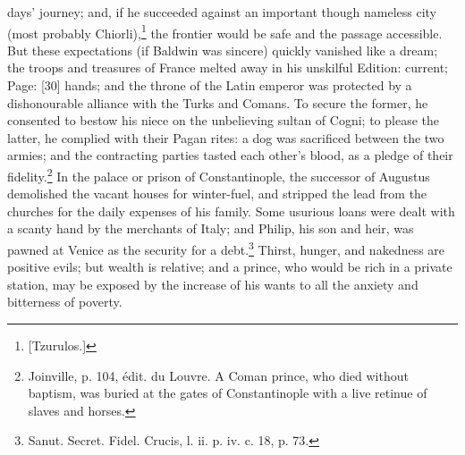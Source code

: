 days\texthebrew{}’ journey; and, if he succeeded against an important though nameless city (most probably Chiorli),\footnote{[Tzurulos.]} the frontier would be safe and the passage accessible. But these expectations (if Baldwin was sincere) quickly vanished like a dream; the troops and treasures of France melted away in his unskilful Edition: current; Page: [30] hands; and the throne of the Latin emperor was protected by a dishonourable alliance with the Turks and Comans. To secure the former, he consented to bestow his niece on the unbelieving sultan of Cogni; to please the latter, he complied with their Pagan rites: a dog was sacrificed between the two armies; and the contracting parties tasted each other\texthebrew{}’s blood, as a pledge of their fidelity.\footnote{Joinville, p. 104, édit. du Louvre. A Coman prince, who died without baptism, was buried at the gates of Constantinople with a live retinue of slaves and horses.} In the palace or prison of Constantinople, the successor of Augustus demolished the vacant houses for winter-fuel, and stripped the lead from the churches for the daily expenses of his family. Some usurious loans were dealt with a scanty hand by the merchants of Italy; and Philip, his son and heir, was pawned at Venice as the security for a debt.\footnote{Sanut. Secret. Fidel. Crucis, l. ii. p. iv. c. 18, p. 73.} Thirst, hunger, and nakedness are positive evils; but wealth is relative; and a prince, who would be rich in a private station, may be exposed by the increase of his wants to all the anxiety and bitterness of poverty.

